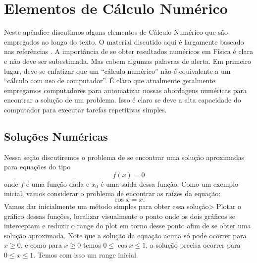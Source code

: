 \chapter{Elementos de Cálculo Numérico}

Neste apêndice discutimos alguns elementos de Cálculo Numérico que são empregados ao longo do texto. O material discutido aqui é largamente baseado nas referências \cite{garcia2000numerical, ayars2013computational, gezerlis2020numerical}. A importância de se obter resultados numéricos em Física é clara e não deve ser subestimada. Mas cabem algumas palavras de alerta. Em primeiro lugar, deve-se enfatizar que um ``cálculo numérico'' não é equivalente a um ``cálculo com uso de computador''. É claro que atualmente geralmente empregamos computadores para automatizar nossas abordagens numéricas para encontrar a solução de um problema. Isso é claro se deve a alta capacidade do computador para executar tarefas repetitivas simples. 


\section{Soluções Numéricas}

Nessa seção discutiremos o problema de se encontrar uma solução aproximadas para equações do tipo
\[f(x) = 0 \]
onde $f$ é uma função dada e $x_0$ é uma saída dessa função. Como um exemplo inicial, vamos considerar o problema de encontrar as raízes da equação:
\[ \cos x = x. \]
Vamos dar inicialmente um método simples para obter essa solução> Plotar o gráfico dessas funções, localizar visualmente o ponto onde os dois gráficos se interceptam e reduzir o range do plot em torno desse ponto afim de se obter uma solução aproximada. Note que a solução da equação acima só pode ocorrer para $x\geqslant 0$, e como para $x\geqslant 0$ temos  $0 \leqslant \cos x \leqslant 1$, a solução precisa ocorrer para $0 \leqslant x \leqslant 1$. Temos com isso um range inicial.

